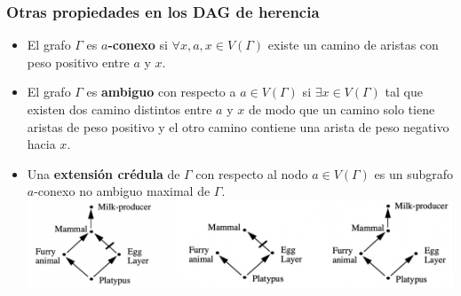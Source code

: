 \documentclass[
10pt, %
aspectratio=169, %
]{beamer}
\begin{document}
	\begin{frame}
		
		\frametitle{Otras propiedades en los DAG de herencia}
		
		\begin{itemize}
			\item El grafo $\Gamma$ es \textbf{$a$-conexo} si $\forall x, a, x \in V(\Gamma)$ existe un camino de aristas con peso positivo entre $a$ y $x$.
			
			\vspace{1\baselineskip}
			\item El grafo $\Gamma$ es \textbf{ambiguo} con respecto a $a \in V(\Gamma)$ si $\exists x \in V(\Gamma)$ tal que existen dos camino distintos entre $a$ y $x$ de modo que un camino solo tiene aristas de peso positivo y el otro camino contiene una arista de peso negativo hacia $x$.
			
			\vspace{1\baselineskip}
			\item Una \textbf{extensión crédula} de $\Gamma$ con respecto al nodo $a \in V(\Gamma)$ es un subgrafo $a$-conexo no ambiguo maximal de $\Gamma$. \\[3mm]
			
			\centering
			\includegraphics[scale=0.27]{credula.png}
			
		\end{itemize}
		
		
	\end{frame}
	
\end{document}
